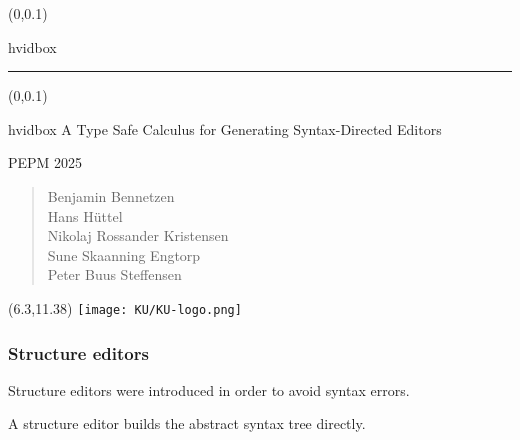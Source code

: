 \documentclass[t,24pt,serif,aspectratio=169]{beamer}
\begin{document}
{
\begin{frame}
    \begin{textblock*}{\textwidth}(0\textwidth,0.1\textheight)
        \begin{beamercolorbox}[wd=7.8cm,ht=7.3cm,sep=0.5cm]{hvidbox}
            \fontsize{5}{10}\selectfont {}
            \noindent\textcolor{KUrod}{\rule{6.8cm}{0.4pt}}
        \end{beamercolorbox}
    \end{textblock*}
    \begin{textblock*}{\textwidth}(0\textwidth,0.1\textheight)
        \begin{beamercolorbox}[wd=7.8cm,sep=0.5cm]{hvidbox}
            \Large \textcolor{KUrod}{A Type Safe Calculus for Generating Syntax-Directed Editors}
            \vspace{0.5cm}
            \par
            \Large PEPM 2025
            \vspace{0.5cm}
            \par
            \normalsize \begin{verse}Benjamin Bennetzen \\
              Hans Hüttel \\
              Nikolaj Rossander Kristensen \\
              Sune Skaanning Engtorp \\
              Peter Buus Steffensen \end{verse}
        \end{beamercolorbox}
    \end{textblock*}
    \begin{textblock}{1}(6.3,11.38)
        \texttt{[image: KU/KU-logo.png]}
    \end{textblock}
\end{frame}
}

\begin{frame}[hvid]
    \frametitle{Structure editors}

    Structure editors were introduced in order to avoid syntax errors.

    A structure editor builds the abstract syntax tree directly.
    
\end{frame}
\end{document}
